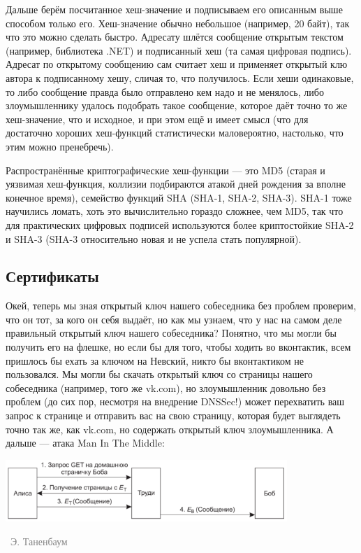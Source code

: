 \documentclass[a5paper]{article}
\newcommand{\attribution}[1] {
\vspace{-5mm}\begin{flushright}\begin{scriptsize}\textcolor{gray}{\textcopyright\, #1}\end{scriptsize}\end{flushright}
}
\begin{document}
Дальше берём посчитанное хеш-значение и подписываем его описанным выше способом только его. Хеш-значение обычно небольшое (например, 20 байт), так что это можно сделать быстро. Адресату шлётся сообщение открытым текстом (например, библиотека .NET) и подписанный хеш (та самая цифровая подпись). Адресат по открытому сообщению сам считает хеш и применяет открытый клю автора к подписанному хешу, сличая то, что получилось. Если хеши одинаковые, то либо сообщение правда было отправлено кем надо и не менялось, либо злоумышленнику удалось подобрать такое сообщение, которое даёт точно то же хеш-значение, что и исходное, и при этом ещё и имеет смысл (что для достаточно хороших хеш-функций статистически маловероятно, настолько, что этим можно пренебречь).

Распространённые криптографические хеш-функции --- это MD5 (старая и уязвимая хеш-функция, коллизии подбираются атакой дней рождения за вполне конечное время), семейство функций SHA (SHA-1, SHA-2, SHA-3). SHA-1 тоже научились ломать, хоть это вычислительно гораздо сложнее, чем MD5, так что для практических цифровых подписей используются более криптостойкие SHA-2 и SHA-3 (SHA-3 относительно новая и не успела стать популярной).

\subsection{Сертификаты}

Окей, теперь мы зная открытый ключ нашего собеседника без проблем проверим, что он тот, за кого он себя выдаёт, но как мы узнаем, что у нас на самом деле правильный открытый ключ нашего собеседника? Понятно, что мы могли бы получить его на флешке, но если бы для того, чтобы ходить во вконтактик, всем пришлось бы ехать за ключом на Невский, никто бы вконтактиком не пользовался. Мы могли бы скачать открытый ключ со страницы нашего собеседника (например, того же vk.com), но злоумышленник довольно без проблем (до сих пор, несмотря на внедрение DNSSec!) может перехватить ваш запрос к странице и отправить вас на свою страницу, которая будет выглядеть точно так же, как vk.com, но содержать открытый ключ злоумышленника. А дальше --- атака Man In The Middle:

\begin{center}
    \includegraphics[width=0.8\textwidth]{manInTheMiddle.png}
    \attribution{Э. Таненбаум}
\end{center}
\end{document}
